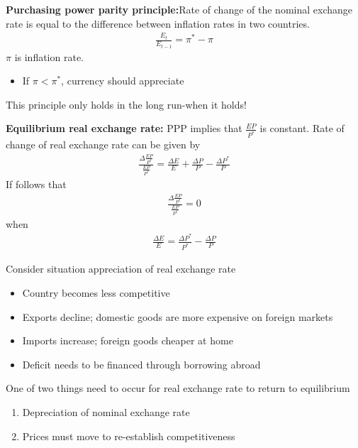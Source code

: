 \documentclass{beamer}
\begin{document}
\begin{frame}
  \textbf{Purchasing power parity principle:}Rate of change of the nominal exchange rate is equal to the difference between inflation rates in two countries.
  \begin{align}
    \frac{E_t}{E_{t-1}} = \pi^* - \pi
  \end{align}
  $\pi$ is inflation rate.
  \begin{itemize}
    \item If $\pi<\pi^*$, currency should appreciate
  \end{itemize}
  This principle only holds in the long run-when it holds!
\end{frame}

\begin{frame}
  \textbf{Equilibrium real exchange rate:} PPP implies that $\frac{EP}{P^*}$ is constant.
  Rate of change of real exchange rate can be given by
  \begin{align}
    \frac{\Delta \frac{EP}{P^*}}{\frac{EP}{P^*}}=  \frac{\Delta E}{E} + \frac{\Delta P}{P} - \frac{\Delta P^*}{P}
  \end{align}
  If follows that
  \begin{align}
    \frac{\Delta \frac{EP}{P^*}}{\frac{EP}{P^*}}=0
  \end{align}
  when
  \begin{align}
    \frac{\Delta E}{E} = \frac{\Delta P^*}{P^*} - \frac{\Delta P}{P}
  \end{align}
\end{frame}



\begin{frame}   
  Consider situation appreciation of real exchange rate
  \begin{itemize}
    \item Country becomes less competitive
    \item Exports decline; domestic goods are more expensive on foreign markets
    \item Imports increase; foreign goods cheaper at home
    \item Deficit needs to be financed through borrowing abroad
  \end{itemize}
  One of two things need to occur for real exchange rate to return to equilibrium
  \begin{enumerate}
    \item Depreciation of nominal exchange rate
    \item Prices must move to re-establish competitiveness
  \end{enumerate}
\end{frame}
\end{document}
